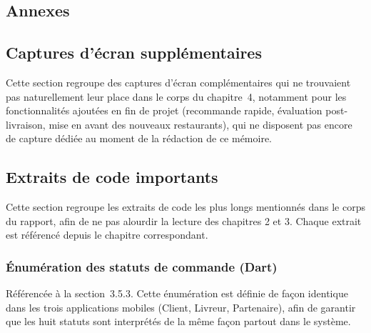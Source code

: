 \documentclass[12pt,fleqn,a4paper]{report}
\begin{document}
\begin{justify}
\clearpage
{}
{}
\printbibliography[title={Références bibliographiques},keyword=biblio]

{}
\printbibliography[title={Webographie},keyword=webo]

\chapter*{Annexes}

\section*{Captures d'écran supplémentaires}

Cette section regroupe des captures d'écran complémentaires qui ne trouvaient pas naturellement leur place dans le corps du chapitre~4, notamment pour les fonctionnalités ajoutées en fin de projet (recommande rapide, évaluation post-livraison, mise en avant des nouveaux restaurants), qui ne disposent pas encore de capture dédiée au moment de la rédaction de ce mémoire.

\section*{Extraits de code importants}

Cette section regroupe les extraits de code les plus longs mentionnés dans le corps du rapport, afin de ne pas alourdir la lecture des chapitres 2 et 3. Chaque extrait est référencé depuis le chapitre correspondant.

\subsection*{Énumération des statuts de commande (Dart)}

Référencée à la section~3.5.3. Cette énumération est définie de façon identique dans les trois applications mobiles (Client, Livreur, Partenaire), afin de garantir que les huit statuts sont interprétés de la même façon partout dans le système.


\end{justify}
\end{document}
